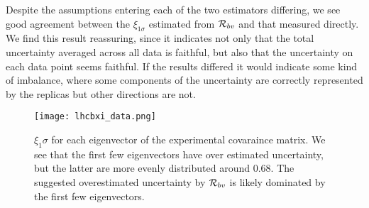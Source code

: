 Despite the assumptions entering each of the two estimators differing, we see
good agreement between the $\xi_{1\sigma}$ estimated from $\mathcal{R}_{bv}$
and that measured directly. We find this result reassuring, since it indicates
not only that the total uncertainty averaged across all data is faithful, but
also that the uncertainty on each data point seems faithful. If the results
differed it would indicate some kind of imbalance, where some components
of the uncertainty are correctly represented by the replicas but other directions
are not.

\begin{figure}
    \centering
    \texttt{[image: lhcbxi\_data.png]}
    \caption{$\xi_1\sigma$ for each eigenvector of the experimental
    covaraince matrix. We see that the first few eigenvectors have over
    estimated uncertainty, but the latter are more evenly distributed
    around 0.68. The suggested overestimated uncertainty by $\mathcal{R}_{bv}$
    is likely dominated by the first few eigenvectors.}
    \label{fig:xibreakdownlhcb}
\end{figure}
